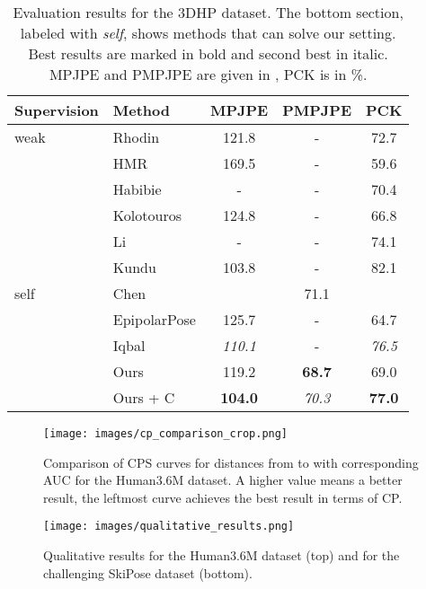 \documentclass[final]{cvpr}
\begin{document}
\begin{table}[htp]
	\footnotesize
    \caption{Evaluation results for the 3DHP dataset. The bottom section, labeled with \textit{self}, shows methods that can solve our setting. Best results are marked in bold and second best in italic. MPJPE and PMPJPE are given in , PCK is in \%.}
	\centering
	\setlength\tabcolsep{4pt}
    \begin{tabular}{ l | l | c c c }
        Supervision & Method & MPJPE & PMPJPE & PCK\\
        \hline
        weak                        & Rhodin \cite{rhodin2018learning}          & 121.8 & - & 72.7 \\
                                    & HMR \cite{Kanazawa:CVPR:2018}             & 169.5 & - & 59.6 \\
                                    & Habibie \cite{Habibie_2019_CVPR}          & -     & - & 70.4 \\
                                    & Kolotouros \cite{SPIN:ICCV:2019}          & 124.8 & - & 66.8 \\
                                    & Li \cite{Li20geometry}                    & -     & - & 74.1 \\
                                    & Kundu \cite{Kundu_2020_CVPR}              & 103.8 & - & 82.1 \\
        \hline
        \hline
        self
                                    & Chen \cite{chen2019unsupervised}               &   & 71.1 \\
                                    & EpipolarPose \cite{kocabas2019epipolar}  & 125.7 & - & 64.7 \\ 
                                    & Iqbal \cite{Iqbal_2020_CVPR}             & \textit{110.1}  & - & \textit{76.5}  \\
        \hline
                                    & Ours                                      & 119.2  & \textbf{68.7} & 69.0 \\
                                    & Ours + C                                  & \textbf{104.0} & \textit{70.3} & \textbf{77.0} \\
    \end{tabular}
    \label{tab:eval_3dhp}
\end{table}

\begin{figure}
	\centering
	\texttt{[image: images/cp\_comparison\_crop.png]}
	\caption{Comparison of CPS curves for distances from  to  with corresponding AUC for the Human3.6M dataset. A higher value means a better result, \ie the leftmost curve achieves the best result in terms of CP.}
	\label{fig:cps}
\end{figure}
\begin{figure*}
	\centering
	\texttt{[image: images/qualitative\_results.png]}
	\caption{Qualitative results for the Human3.6M dataset (top) and for the challenging SkiPose dataset (bottom).}
	\label{fig:results}
\end{figure*}
\end{document}
